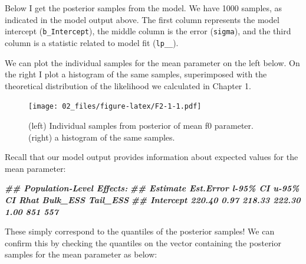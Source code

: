 \documentclass[
]{book}
\newenvironment{Shaded}{\begin{snugshade}}{\end{snugshade}}
\newcommand{\CommentTok}[1]{\textcolor[rgb]{0.56,0.35,0.01}{\textit{#1}}}
\newcommand{\DocumentationTok}[1]{\textcolor[rgb]{0.56,0.35,0.01}{\textbf{\textit{#1}}}}
\newcommand{\FunctionTok}[1]{\textcolor[rgb]{0.00,0.00,0.00}{#1}}
\newcommand{\NormalTok}[1]{#1}
\newcommand{\OtherTok}[1]{\textcolor[rgb]{0.56,0.35,0.01}{#1}}
\newcommand{\SpecialCharTok}[1]{\textcolor[rgb]{0.00,0.00,0.00}{#1}}
\begin{document}
Below I get the posterior samples from the model. We have 1000 samples, as indicated in the model output above. The first column represents the model intercept (\texttt{b\_Intercept}), the middle column is the error (\texttt{sigma}), and the third column is a statistic related to model fit (\texttt{lp\_\_}).

\begin{Shaded}
\end{Shaded}

We can plot the individual samples for the mean parameter on the left below. On the right I plot a histogram of the same samples, superimposed with the theoretical distribution of the likelihood we calculated in Chapter 1.

\begin{figure}
\centering
\texttt{[image: 02\_files/figure-latex/F2-1-1.pdf]}
\caption{\label{fig:F2-1}(left) Individual samples from posterior of mean f0 parameter. (right) a histogram of the same samples.}
\end{figure}

Recall that our model output provides information about expected values for the mean parameter:

\begin{Shaded}
\begin{Highlighting}[]
\DocumentationTok{\#\# Population{-}Level Effects: }
\DocumentationTok{\#\#           Estimate Est.Error l{-}95\% CI u{-}95\% CI Rhat Bulk\_ESS Tail\_ESS}
\DocumentationTok{\#\# Intercept   220.40      0.97   218.33   222.30 1.00      851      557}
\end{Highlighting}
\end{Shaded}

These simply correspond to the quantiles of the posterior samples! We can confirm this by checking the quantiles on the vector containing the posterior samples for the mean parameter as below:
\end{document}
